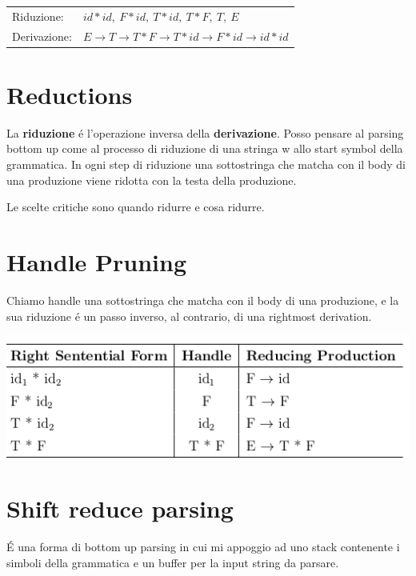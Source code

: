 \begin{tabular}{ll}
    Riduzione:      &   $id * id,\ F * id,\ T * id,\ T * F,\ T,\ E$\\
    Derivazione:    &   $E \rightarrow T \rightarrow T * F \rightarrow T * id \rightarrow F * id \rightarrow id * id$\\
\end{tabular}

\section{Reductions}
La \textbf{riduzione} \'e l'operazione inversa della \textbf{derivazione}.
Posso pensare al parsing bottom up come al processo di riduzione di una stringa w allo start symbol della grammatica.
In ogni step di riduzione una sottostringa che matcha con il body di una produzione viene ridotta con la testa della produzione.

Le scelte critiche sono quando ridurre e cosa ridurre.

\section{Handle Pruning}
Chiamo handle una sottostringa che matcha con il body di una produzione, e la sua riduzione \'e un passo inverso, al contrario, di una 
rightmost derivation.

\begin{center}
    \includegraphics[scale=0.6]{Chapters/Img/c04_03.png}\\
\end{center}

\section{Shift reduce parsing}
\'E una forma di bottom up parsing in cui mi appoggio ad uno stack contenente i simboli della grammatica e un buffer per la input string
da parsare. 

